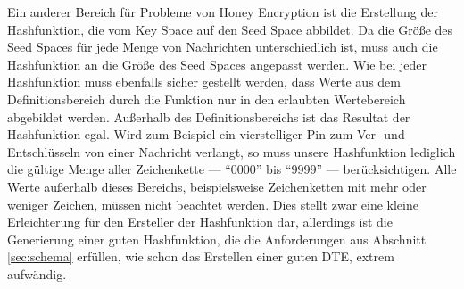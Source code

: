 Ein anderer Bereich für Probleme von Honey Encryption ist die Erstellung der Hashfunktion, die vom Key Space auf den Seed Space abbildet. Da die Größe des Seed Spaces für jede Menge von Nachrichten unterschiedlich ist, muss auch die Hashfunktion an die Größe des Seed Spaces angepasst werden. Wie bei jeder Hashfunktion muss ebenfalls sicher gestellt werden, dass Werte aus dem Definitionsbereich durch die Funktion nur in den erlaubten Wertebereich abgebildet werden. Außerhalb des Definitionsbereichs ist das Resultat der Hashfunktion egal. Wird zum Beispiel ein vierstelliger Pin zum Ver- und Entschlüsseln von einer Nachricht verlangt, so muss unsere Hashfunktion lediglich die gültige Menge aller Zeichenkette --- ``0000'' bis ``9999'' --- berücksichtigen. Alle Werte außerhalb dieses Bereichs, beispielsweise Zeichenketten mit mehr oder weniger Zeichen, müssen nicht beachtet werden. Dies stellt zwar eine kleine Erleichterung für den Ersteller der Hashfunktion dar, allerdings ist die Generierung einer guten Hashfunktion, die die Anforderungen aus Abschnitt \ref{sec:schema} erfüllen, wie schon das Erstellen einer guten DTE, extrem aufwändig.

